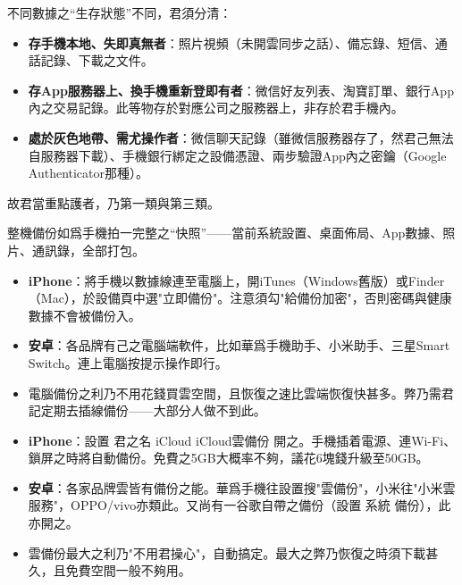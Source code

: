 


不同數據之“生存狀態”不同，君須分清：

\begin{itemize}
  \item \textbf{存手機本地、失即真無者}：照片視頻（未開雲同步之話）、備忘錄、短信、通話記錄、下載之文件。
  \item \textbf{存App服務器上、換手機重新登即有者}：微信好友列表、淘寶訂單、銀行App內之交易記錄。此等物存於對應公司之服務器上，非存於君手機內。
  \item \textbf{處於灰色地帶、需尤操作者}：微信聊天記錄（雖微信服務器存了，然君己無法自服務器下載）、手機銀行綁定之設備憑證、兩步驗證App內之密鑰（Google Authenticator那種）。
\end{itemize}

故君當重點護者，乃第一類與第三類。


整機備份如爲手機拍一完整之“快照”——當前系統設置、桌面佈局、App數據、照片、通訊錄，全部打包。


\begin{itemize}
  \item \textbf{iPhone}：將手機以數據線連至電腦上，開iTunes（Windows舊版）或Finder（Mac），於設備頁中選"立即備份"。注意須勾"給備份加密"，否則密碼與健康數據不會被備份入。
  \item \textbf{安卓}：各品牌有己之電腦端軟件，比如華爲手機助手、小米助手、三星Smart Switch。連上電腦按提示操作即行。
  \item 電腦備份之利乃不用花錢買雲空間，且恢復之速比雲端恢復快甚多。弊乃需君記定期去插線備份——大部分人做不到此。
\end{itemize}


\begin{itemize}
  \item \textbf{iPhone}：設置 君之名 iCloud iCloud雲備份 開之。手機插着電源、連Wi-Fi、鎖屏之時將自動備份。免費之5GB大概率不夠，議花6塊錢升級至50GB。
  \item \textbf{安卓}：各家品牌雲皆有備份之能。華爲手機往設置搜"雲備份"，小米往"小米雲服務"，OPPO/vivo亦類此。又尚有一谷歌自帶之備份（設置 系統 備份），此亦開之。
  \item 雲備份最大之利乃"不用君操心"，自動搞定。最大之弊乃恢復之時須下載甚久，且免費空間一般不夠用。
\end{itemize}

